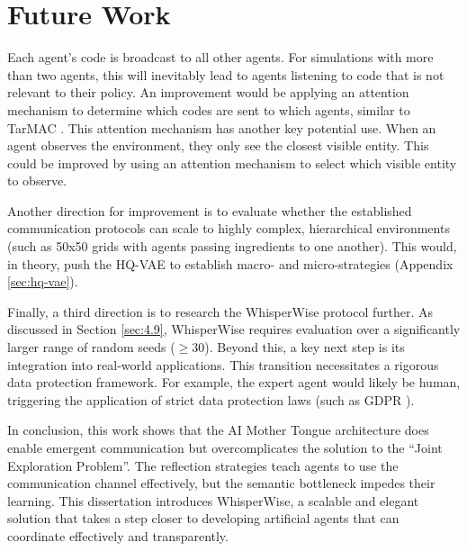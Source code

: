 



\section{Future Work}
\label{sec:5.3}

Each agent's code is broadcast to all other agents.
For simulations with more than two agents, this will inevitably lead to agents listening to code that is not relevant to their policy.
An improvement would be applying an attention mechanism to determine which codes are sent to which agents, similar to TarMAC \cite{tarmac}.
This attention mechanism has another key potential use.
When an agent observes the environment, they only see the closest visible entity.
This could be improved by using an attention mechanism to select which visible entity to observe.

Another direction for improvement is to evaluate whether the established communication protocols can scale to highly complex, hierarchical environments (such as 50x50 grids with agents passing ingredients to one another).
This would, in theory, push the HQ-VAE to establish macro- and micro-strategies (Appendix \ref{sec:hq-vae}).

Finally, a third direction is to research the WhisperWise protocol further.
As discussed in Section \ref{sec:4.9}, WhisperWise requires evaluation over a significantly larger range of random seeds ($\geq 30$).
Beyond this, a key next step is its integration into real-world applications.
This transition necessitates a rigorous data protection framework.
For example, the expert agent would likely be human, triggering the application of strict data protection laws (such as GDPR \cite{gdpr}).

In conclusion, this work shows that the AI Mother Tongue architecture does enable emergent communication but overcomplicates the solution to the ``Joint Exploration Problem''.
The reflection strategies teach agents to use the communication channel effectively, but the semantic bottleneck impedes their learning.
This dissertation introduces WhisperWise, a scalable and elegant solution that takes a step closer to developing artificial agents that can coordinate effectively and transparently.